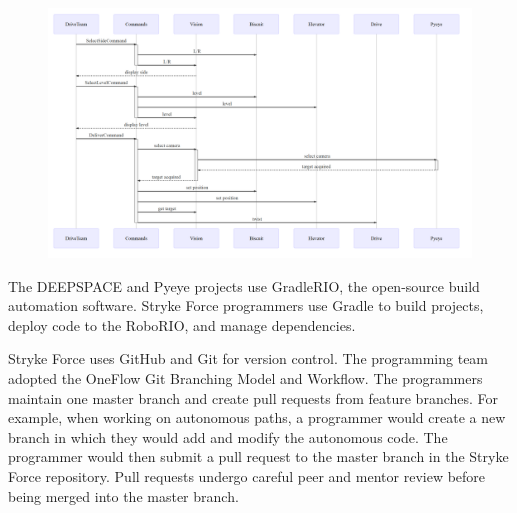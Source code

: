 \documentclass[10pt,tumble]{leaflet}
\begin{document}
\begin{figure}[H]
	\centering
	\includegraphics[scale=0.18]{assets/mermaid}
\end{figure}

The DEEPSPACE and Pyeye projects use GradleRIO, the open-source build automation software. Stryke Force programmers use Gradle to build projects, deploy code to the RoboRIO, and manage dependencies.

Stryke Force uses GitHub and Git for version control. The programming team adopted the OneFlow Git Branching Model and Workflow.  The programmers maintain one master branch and create pull requests from feature branches.  For example, when working on autonomous paths, a programmer would create a new branch in which they would add and modify the autonomous code.  The programmer would then submit a pull request to the master branch in the Stryke Force repository. Pull requests undergo careful peer and mentor review before being merged into the master branch.
\end{document}
